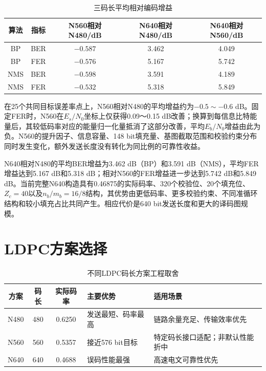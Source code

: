 \clearpage

\begin{table}[htbp]
  \centering\small
  \caption{三码长平均相对编码增益}
  \label{tab:ldpc-gain}
  \begin{tabular}{c c c c c}
    \toprule
    算法 & 指标 & N560相对N480/dB & N640相对N480/dB & N640相对N560/dB\\
    \midrule
    BP  & BER & $-0.587$ & 3.462 & 4.049\\
    BP  & FER & $-0.576$ & 5.167 & 5.742\\
    NMS & BER & $-0.598$ & 3.591 & 4.189\\
    NMS & FER & $-0.532$ & 5.318 & 5.849\\
    \bottomrule
  \end{tabular}
\end{table}

在25个共同目标误差率点上，N560相对N480的平均增益约为$-0.5\sim-0.6$ dB。固定FER时，N560在$E_s/N_0$坐标上仅获得0.09～0.15 dB改善；换算到每信息比特能量后，其较低码率对应的能量归一化量抵消了这部分改善，平均$E_b/N_0$增益由此为负。N560的提升因子、信息容量、148 bit填充量、基图截取范围和校验约束分布同时发生变化，额外发送长度没有转化为同比例的可靠性收益。

N640相对N480的平均BER增益为3.462 dB（BP）和3.591 dB（NMS），平均FER增益达到5.167 dB和5.318 dB；相对N560的FER增益进一步达到5.742 dB和5.849 dB。当前完整N640构造具有0.46875的实际码率、320个校验位、20个填充位、$Z_c=40$以及$n_b/m_b=16/8$结构，其优势由更低码率、更多校验约束、不同准循环结构和较小填充占比共同产生。相应代价是640 bit发送长度和更大的译码图规模。

\section{LDPC方案选择}

\begin{table}[!ht]
  \centering\small
  \caption{不同LDPC码长方案工程取舍}
  \label{tab:ldpc-length-tradeoff}
  \begin{tabular}{c c c p{}p{}}
    \toprule
    方案 & 码长 & 实际码率 & 主要优势 & 适用场景\\
    \midrule
    N480 & 480 & 0.6250 & 发送最短、码率最高 & 链路余量充足、传输效率优先\\
    N560 & 560 & 0.5357 & 接近576 bit目标 & 特定码长接口适配；非默认性能折中\\
    N640 & 640 & 0.4688 & 误码性能最强 & 高速电文可靠性优先\\
    \bottomrule
  \end{tabular}
\end{table}

